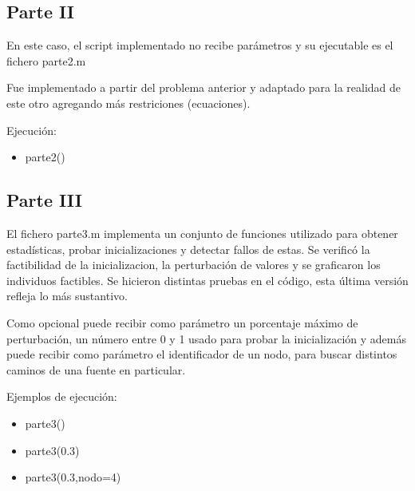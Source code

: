 \documentclass{extarticle}
\begin{document}
\subsection{Parte II}
En este caso, el script implementado no recibe parámetros y su ejecutable es el fichero parte2.m

Fue implementado a partir del problema anterior y adaptado para la realidad de este otro agregando más restriciones (ecuaciones).

Ejecución:
\begin{itemize}
	\item parte2() 
\end{itemize}

\subsection{Parte III}
El fichero parte3.m implementa un conjunto de funciones utilizado para obtener estadísticas, probar inicializaciones y detectar fallos de estas. 
Se verificó la factibilidad de la inicializacion, la perturbación de valores y se graficaron los individuos factibles.
Se hicieron distintas pruebas en el código, esta última versión refleja lo más sustantivo.

Como opcional puede recibir como parámetro un porcentaje máximo de perturbación, un número entre 0 y 1 usado para probar la inicialización y además puede recibir como parámetro el identificador de un nodo, para buscar distintos caminos de una fuente en particular.

Ejemplos de ejecución:
\begin{itemize}
	\item parte3()
	\item parte3(0.3)
	\item parte3(0.3,nodo=4) 
\end{itemize}
\end{document}

